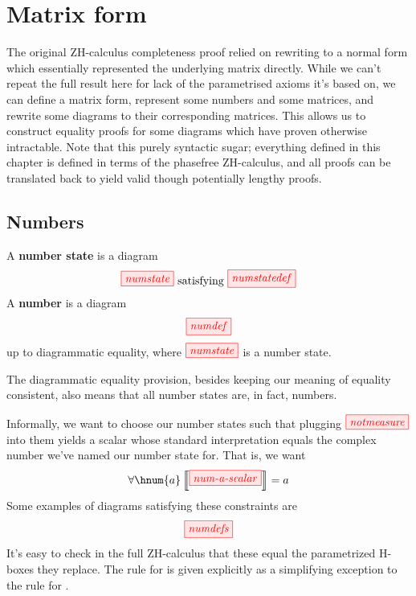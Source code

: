 \chapter{Matrix form}\label{chap:matrices}
The original ZH-calculus completeness proof relied on rewriting to a normal form
which essentially represented the underlying matrix directly. While we can't
repeat the full result here for lack of the parametrised axioms it's based on,
we can define a matrix form, represent some numbers and some matrices, and
rewrite some diagrams to their corresponding matrices. This allows us to
construct equality proofs for some diagrams which have proven otherwise
intractable. Note that this purely syntactic sugar; everything defined in this
chapter is defined in terms of the phasefree ZH-calculus, and all proofs can be
translated back to yield valid though potentially lengthy proofs.

\section{Numbers}

\begin{definition}
    A \textbf{number state} is a diagram
    $$\tikzfig{numstate} \text{ satisfying } \tikzfig{numstatedef}$$
    A \textbf{number} is a diagram 
    $$\tikzfig{numdef}$$
    up to diagrammatic equality, where $\tikzfig{numstate}$ is a number state.
\end{definition}
\begin{remark*}
    The diagrammatic equality provision, besides keeping our meaning of equality
    consistent, also means that all number states are, in fact, numbers.
\end{remark*}

Informally, we want to choose our number states such that plugging
$\tikzfig{notmeasure}$ into them yields a scalar whose standard interpretation
equals the complex number we've named our number state for. That is, we want
$$\forall \hnum{a} \intf{\tikzfig{num-a-scalar}} = a$$
Some examples of diagrams satisfying these constraints are
$$\tikzfig{numdefs}$$
It's easy to check in the full ZH-calculus that these equal the parametrized
H-boxes they replace. The rule for  is given explicitly as a
simplifying exception to the rule for .

